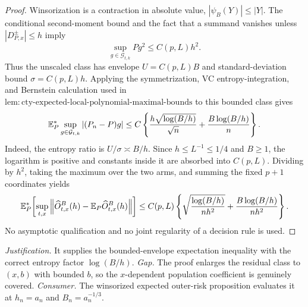 \documentclass{article}
\begin{document}
\begin{proof}
Winsorization is a contraction in absolute value, \(|\psi_B(Y)|\leq|Y|\).  The conditional second-moment bound and the fact that a summand vanishes unless \(|D^{\pm}_{P,x}|\leq h\) imply
\[
 \sup_{g\in\mathcal G_{t,k}}Pg^2\leq C(p,L)h^2.
\]
Thus the unscaled class has envelope \(U=C(p,L)B\) and standard-deviation bound \(\sigma=C(p,L)h\).  Applying the symmetrization, VC entropy-integration, and Bernstein calculation used in \(\mathrm{lem:cty\text{-}expected\text{-}local\text{-}polynomial\text{-}maximal\text{-}bounds}\) to this bounded class gives
\[
 \mathbb E_P^*\sup_{g\in\mathcal G_{t,k}}|(P_n-P)g|
 \leq C\left\{
 {h\sqrt{\log(B/h)}\over\sqrt n}
 +{B\log(B/h)\over n}
 \right\}.
\]
Indeed, the entropy ratio is \(U/\sigma\asymp B/h\).  Since \(h\leq L^{-1}\leq1/4\) and \(B\geq1\), the logarithm is positive and constants inside it are absorbed into \(C(p,L)\).  Dividing by \(h^2\), taking the maximum over the two arms, and summing the fixed \(p+1\) coordinates yields
\[
 \mathbb E_P^*\!\left[
 \sup_{t,x}\left\|\widehat O^B_{t,x}(h)-\mathbb E_P\widehat O^B_{t,x}(h)\right\|
 \right]
 \leq C(p,L)\left\{
 \sqrt{{\log(B/h)\over nh^2}}+{B\log(B/h)\over nh^2}
 \right\}.
\]
No asymptotic qualification and no joint regularity of a decision rule is used.
\end{proof}
\par\smallskip\noindent \textit{Justification.} It supplies the bounded-envelope expectation inequality with the correct entropy factor \(\log(B/h)\). \textit{Gap.} The proof enlarges the residual class to \((x,b)\) with bounded \(b\), so the \(x\)-dependent population coefficient is genuinely covered. \textit{Consumer.} The winsorized expected outer-risk proposition evaluates it at \(h_n=a_n\) and \(B_n=a_n^{-1/3}\).
\end{document}
